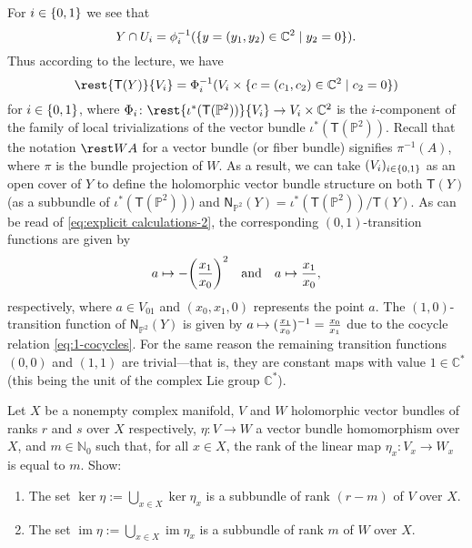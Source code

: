 \documentclass[a4paper]{amsart}
\newcommand{\N}{\mathbb{N}}
\newcommand{\C}{\mathbb{C}}
\newcommand{\TB}[1]{\mathsf{T}(#1)}
\newcommand{\NB}[2]{\mathsf{N}_{#2}(#1)}
\renewcommand{\P}{\mathbb{P}}
\theoremstyle{remark}
\numberwithin{equation}{question}
\DeclarePairedDelimiter\set{\{}{\}}
\DeclarePairedDelimiter\paren{(}{)}
\DeclareMathOperator{\im}{im}
\begin{document}
\begin{solution}
\begin{solenum}
For $i \in \set{0,1}$ we see that
\[
Y \cap U_i = \phi_i^{-1}(\set{y = (y_1,y_2) \in \C^2 \mid y_2 = 0}).
\]
Thus according to the lecture, we have
\[
\rest{\TB Y}{V_i} = \Phi_i^{-1}(V_i \times \set{c = (c_1,c_2) \in \C^2 \mid c_2 = 0})
\]
for $i \in \set{0,1}$, where $\Phi_i \colon \rest{\iota^*(\TB{\P^2})}{V_i} \to V_i \times \C^2$ is the $i$-component of the family of local trivializations of the vector bundle $\iota^*(\TB{\P^2})$. Recall that the notation $\rest WA$ for a vector bundle (or fiber bundle) signifies $\pi^{-1}(A)$, where $\pi$ is the bundle projection of $W$. As a result, we can take $(V_i)_{i \in \set{0,1}}$ as an open cover of $Y$ to define the holomorphic vector bundle structure on both $\TB Y$ (as a subbundle of $\iota^*(\TB{\P^2})$) and $\NB Y{\P^2} = \iota^*(\TB{\P^2})/\TB Y$. As can be read of \cref{eq:explicit calculations-2}, the corresponding $(0,1)$-transition functions are given by
\[
a \mapsto -\paren*{\frac{x_1}{x_0}}^2 \quad \text{and} \quad a \mapsto \frac{x_1}{x_0},
\]
respectively, where $a \in V_{01}$ and $(x_0,x_1,0)$ represents the point $a$. The $(1,0)$-transition function of $\NB Y{\P^2}$ is given by $a \mapsto \paren{\frac{x_1}{x_0}}^{-1} = \frac{x_0}{x_1}$ due to the cocycle relation \cref{eq:1-cocycles}. For the same reason the remaining transition functions $(0,0)$ and $(1,1)$ are trivial---that is, they are constant maps with value $1 \in \C^*$ (this being the unit of the complex Lie group $\C^*$).
\end{solenum}
\end{solution}

\begin{question}[subtitle=The kernel and the image of a vector bundle homomorphism]
\label{qu:kernel bundle}
Let $X$ be a nonempty complex manifold, $V$ and $W$ holomorphic vector bundles of ranks $r$ and $s$ over $X$ respectively, $\eta \colon V \to W$ a vector bundle homomorphism over $X$, and $m \in \N_0$ such that, for all $x \in X$, the rank of the linear map $\eta_x \colon V_x \to W_x$ is equal to $m$. Show:
\begin{enumerate}
\item The set $\ker\eta := \bigcup_{x \in X} \ker\eta_x$ is a subbundle of rank $(r-m)$ of $V$ over $X$.
\item The set $\im\eta := \bigcup_{x \in X} \im\eta_x$ is a subbundle of rank $m$ of $W$ over $X$.
\end{enumerate}
\end{question}
\end{document}
